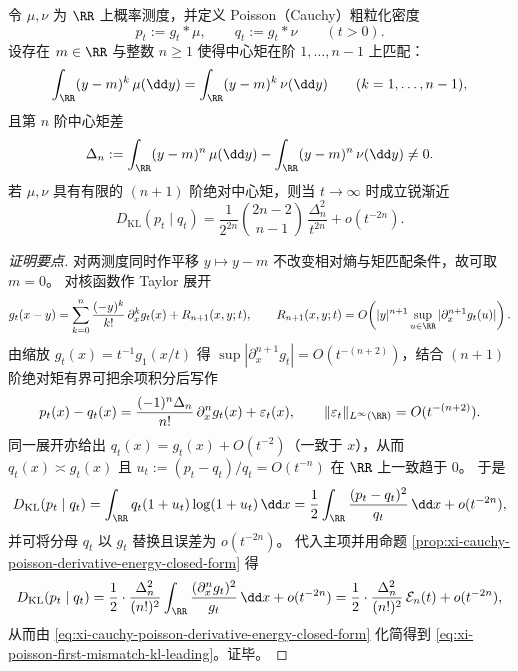 \begin{theorem}\label{thm:xi-poisson-coarsegraining-first-mismatch-kl}
令 \(\mu,\nu\) 为 \(\RR\) 上概率测度，并定义 Poisson（Cauchy）粗粒化密度
\[
p_t:=g_t*\mu,\qquad q_t:=g_t*\nu\qquad(t>0).
\]
设存在 \(m\in\RR\) 与整数 \(n\ge 1\) 使得中心矩在阶 \(1,\dots,n-1\) 上匹配：
\[
\int_{\RR}(y-m)^k\,\mu(\dd y)=\int_{\RR}(y-m)^k\,\nu(\dd y)\qquad(k=1,\dots,n-1),
\]
且第 \(n\) 阶中心矩差
\[
\Delta_n:=\int_{\RR}(y-m)^n\,\mu(\dd y)-\int_{\RR}(y-m)^n\,\nu(\dd y)\neq 0.
\]
若 \(\mu,\nu\) 具有有限的 \((n+1)\) 阶绝对中心矩，则当 \(t\to\infty\) 时成立锐渐近
\begin{equation}\label{eq:xi-poisson-first-mismatch-kl-leading}
\boxed{\;
D_{\mathrm{KL}}(p_t\mid q_t)
=\frac{1}{2^{2n}}\binom{2n-2}{n-1}\,\frac{\Delta_n^2}{t^{2n}}+o(t^{-2n}).\;}
\end{equation}
\end{theorem}

\begin{proof}[证明要点]
对两测度同时作平移 \(y\mapsto y-m\) 不改变相对熵与矩匹配条件，故可取 \(m=0\)。
对核函数作 Taylor 展开
\[
g_t(x-y)=\sum_{k=0}^{n}\frac{(-y)^k}{k!}\,\partial_x^k g_t(x)+R_{n+1}(x,y;t),
\qquad
R_{n+1}(x,y;t)=O\!\left(|y|^{n+1}\sup_{u\in\RR}|\partial_x^{n+1}g_t(u)|\right).
\]
由缩放 \(g_t(x)=t^{-1}g_1(x/t)\) 得 \(\sup|\partial_x^{n+1}g_t|=O(t^{-(n+2)})\)，结合 \((n+1)\) 阶绝对矩有界可把余项积分后写作
\[
p_t(x)-q_t(x)=\frac{(-1)^n\Delta_n}{n!}\,\partial_x^n g_t(x)+\varepsilon_t(x),
\qquad \|\varepsilon_t\|_{L^\infty(\RR)}=O(t^{-(n+2)}).
\]
同一展开亦给出 \(q_t(x)=g_t(x)+O(t^{-2})\)（一致于 \(x\)），从而 \(q_t(x)\asymp g_t(x)\) 且
\(
u_t:=(p_t-q_t)/q_t=O(t^{-n})
\)
在 \(\RR\) 上一致趋于 \(0\)。
于是
\[
D_{\mathrm{KL}}(p_t\mid q_t)
=\int_{\RR} q_t(1+u_t)\log(1+u_t)\,\dd x
=\frac12\int_{\RR}\frac{(p_t-q_t)^2}{q_t}\,\dd x+o(t^{-2n}),
\]
并可将分母 \(q_t\) 以 \(g_t\) 替换且误差为 \(o(t^{-2n})\)。
代入主项并用命题 \ref{prop:xi-cauchy-poisson-derivative-energy-closed-form} 得
\[
D_{\mathrm{KL}}(p_t\mid q_t)
=\frac12\cdot\frac{\Delta_n^2}{(n!)^2}\int_{\RR}\frac{(\partial_x^n g_t)^2}{g_t}\,\dd x+o(t^{-2n})
=\frac12\cdot\frac{\Delta_n^2}{(n!)^2}\,\mathcal E_n(t)+o(t^{-2n}),
\]
从而由 \eqref{eq:xi-cauchy-poisson-derivative-energy-closed-form} 化简得到 \eqref{eq:xi-poisson-first-mismatch-kl-leading}。证毕。
\end{proof}

